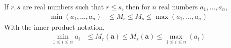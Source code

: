 \documentclass{subfile}
\begin{document}
		\begin{theorem}
			If $r,s$ are real numbers such that $r\leq s$, then for $n$ real numbers $a_1,\ldots,a_n$,
				\begin{align*}
					\min(a_1,\ldots,a_n)
						& \leq M_r\leq M_s\leq\max(a_1,\ldots,a_n)
				\end{align*}
			With the inner product notation,
				\begin{align*}
					\min_{1\leq i\leq n}a_i
						& \leq M_r(\mathbf{a})\leq M_s(\mathbf{a})\leq\max_{1\leq i\leq n}(a_i)
				\end{align*}
		\end{theorem}
\end{document}
